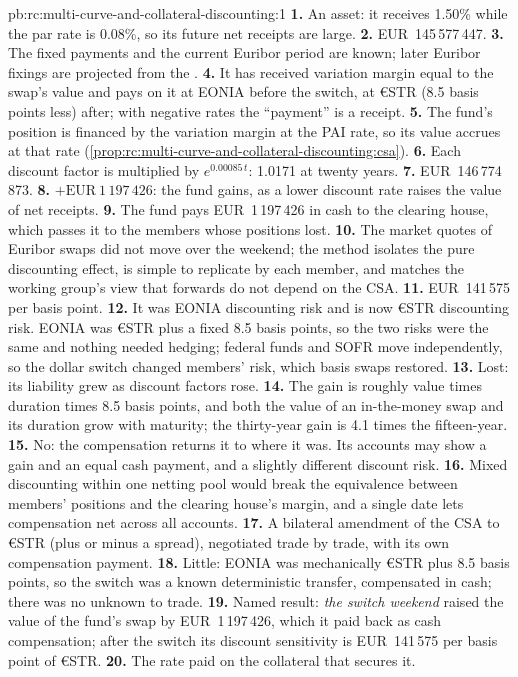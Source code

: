 \begin{solution}{pb:rc:multi-curve-and-collateral-discounting:1}
\textbf{1.} An asset: it receives 1.50\% while the par rate is 0.08\%, so its
future net receipts are large.
\textbf{2.} EUR~145\,577\,447.
\textbf{3.} The fixed payments and the current Euribor period are known; later
Euribor fixings are projected from the .
\textbf{4.} It has received variation margin equal to the swap's value and
pays  on it at EONIA before the switch, at €STR (8.5
basis points less) after; with negative rates the ``payment'' is a receipt.
\textbf{5.} The fund's position is financed by the variation margin at the PAI
rate, so its value accrues at that rate
(\cref{prop:rc:multi-curve-and-collateral-discounting:csa}).
\textbf{6.} Each discount factor is multiplied by $e^{0.00085\,t}$: 1.0171 at
twenty years.
\textbf{7.} EUR~146\,774\,873.
\textbf{8.} $+\text{EUR}~1\,197\,426$: the fund gains, as a lower discount rate
raises the value of net receipts.
\textbf{9.} The fund pays EUR~1\,197\,426 in cash to the clearing house, which
passes it to the members whose positions lost.
\textbf{10.} The market quotes of Euribor swaps did not move over the weekend;
the method isolates the pure discounting effect, is simple to replicate by each
member, and matches the working group's view that forwards do not depend on
the CSA.
\textbf{11.} EUR~141\,575 per basis point.
\textbf{12.} It was EONIA discounting risk and is now €STR discounting risk.
EONIA was €STR plus a fixed 8.5 basis points, so the two risks were the same
and nothing needed hedging; federal funds and SOFR move independently, so the
dollar switch changed members' risk, which basis swaps restored.
\textbf{13.} Lost: its liability grew as discount factors rose.
\textbf{14.} The gain is roughly value times duration times 8.5 basis points,
and both the value of an in-the-money swap and its duration grow with
maturity; the thirty-year gain is 4.1 times the fifteen-year.
\textbf{15.} No: the compensation returns it to where it was. Its accounts may
show a gain and an equal cash payment, and a slightly different discount risk.
\textbf{16.} Mixed discounting within one netting pool would break the
equivalence between members' positions and the clearing house's margin, and a
single date lets compensation net across all accounts.
\textbf{17.} A bilateral amendment of the CSA to €STR (plus or minus a spread),
negotiated trade by trade, with its own compensation payment.
\textbf{18.} Little: EONIA was mechanically €STR plus 8.5 basis points, so the
switch was a known deterministic transfer, compensated in cash; there was no
unknown to trade.
\textbf{19.} Named result: \emph{the switch weekend} raised the value of the
fund's swap by EUR~1\,197\,426, which it paid back as cash compensation; after
the switch its discount sensitivity is EUR~141\,575 per basis point of €STR.
\textbf{20.} The rate paid on the collateral that secures it.
\end{solution}

